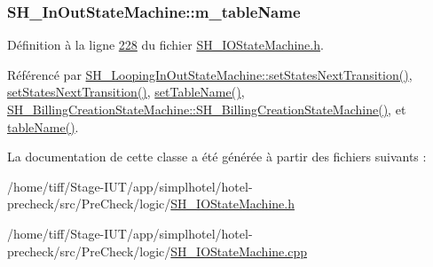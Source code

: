 \hypertarget{classSH__InOutStateMachine_aa009eecc5ab6181358faafb5996b6006}{
\subsubsection[{m\-\_\-table\-Name}]{\setlength{\rightskip}{0pt plus 5cm}S\-H\-\_\-\-In\-Out\-State\-Machine\-::m\-\_\-table\-Name\hspace{0.3cm}{\ttfamily [protected]}}}\label{classSH__InOutStateMachine_aa009eecc5ab6181358faafb5996b6006}


Définition à la ligne \hyperlink{SH__IOStateMachine_8h_source_l00228}{228} du fichier \hyperlink{SH__IOStateMachine_8h_source}{S\-H\-\_\-\-I\-O\-State\-Machine.\-h}.



Référencé par \hyperlink{classSH__LoopingInOutStateMachine_a0ee122553641721012f3710e71cce234}{S\-H\-\_\-\-Looping\-In\-Out\-State\-Machine\-::set\-States\-Next\-Transition()}, \hyperlink{classSH__InOutStateMachine_a70d6d81c0a8d4afd6aab0a7239edc237}{set\-States\-Next\-Transition()}, \hyperlink{classSH__InOutStateMachine_a95db31a7e7f31f36a8737adc739ab08c}{set\-Table\-Name()}, \hyperlink{classSH__BillingCreationStateMachine_ad62b77fa4aeafe200056ff3974562f83}{S\-H\-\_\-\-Billing\-Creation\-State\-Machine\-::\-S\-H\-\_\-\-Billing\-Creation\-State\-Machine()}, et \hyperlink{classSH__InOutStateMachine_a4288a6c86ddf83effefff886675591c9}{table\-Name()}.



La documentation de cette classe a été générée à partir des fichiers suivants \-:\begin{DoxyCompactItemize}
\item 
/home/tiff/\-Stage-\/\-I\-U\-T/app/simplhotel/hotel-\/precheck/src/\-Pre\-Check/logic/\hyperlink{SH__IOStateMachine_8h}{S\-H\-\_\-\-I\-O\-State\-Machine.\-h}\item 
/home/tiff/\-Stage-\/\-I\-U\-T/app/simplhotel/hotel-\/precheck/src/\-Pre\-Check/logic/\hyperlink{SH__IOStateMachine_8cpp}{S\-H\-\_\-\-I\-O\-State\-Machine.\-cpp}\end{DoxyCompactItemize}
